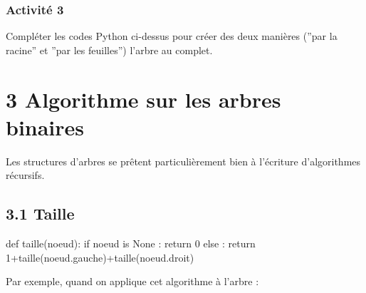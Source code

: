 \documentclass[11pt,a4paper,french,twoside]{PMCours}
\begin{document}
\subsubsection*{Activité 3}
Compléter les codes Python ci-dessus pour créer des deux manières (''par la racine'' et ''par les feuilles'') l'arbre au complet. 

\newpage\noindent
\section*{\vskip -8mm 3 Algorithme sur les arbres binaires}
Les structures d'arbres se prêtent particulièrement bien à l'écriture d'algorithmes récursifs.
\subsection*{\vskip -7mm 3.1 Taille}
\begin{Python}
def taille(noeud):
	if noeud is None :
		return 0
	else :
		return 1+taille(noeud.gauche)+taille(noeud.droit)
\end{Python} 
Par exemple, quand on applique cet algorithme à l'arbre :
\end{document}
